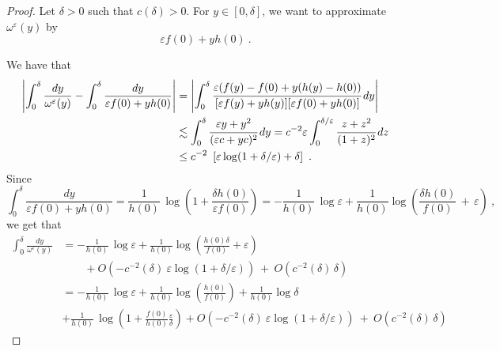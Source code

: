 \documentclass[reqno, 12pt, a4paper]{amsart}
\theoremstyle{plain}
\theoremstyle{definition}
\begin{document}
\begin{proof} 

Let $\delta>0$ such that $c(\delta)>0$. For $y \in [0,\delta]$, we want to approximate $\omega^\varepsilon (y)$ by 
\begin{equation}
\varepsilon f(0) + y h(0) \ .
\end{equation}

We have that 
\begin{equation}
\label{eq:0delta}
\begin{split}
\left\vert \int_0^\delta \frac{dy}{\omega^\varepsilon (y)} - \int_0^\delta \frac{dy}{\varepsilon f(0) + y h(0)}\right\vert &= \left\vert \int_0^\delta \cfrac{\varepsilon (f(y)- f(0) +y (h(y) -h(0))}{[\varepsilon f(y) + y h(y)][\varepsilon f(0) + y h(0)]} \, dy\right\vert \\
&\lesssim \int_0^\delta \cfrac{\varepsilon y + y^2}{(\varepsilon c + yc)^2} \, dy = c^{-2} \varepsilon  \int_0^{\delta/\varepsilon} \cfrac{ z + z^2}{(1+z)^2} \, dz \\
&\le c^{-2} \ \left[ \varepsilon \log (1+ \delta/\varepsilon) + \delta \right]      \ .   
\end{split}
\end{equation}
Since
\begin{equation}
\int_0^\delta \frac{dy}{\varepsilon f(0) + y h(0)} = \frac{1}{h(0)} \, \log\left(1 + \frac{\delta h(0)}{\varepsilon f(0)}\right) =- \frac{1}{h(0)} \, \log \varepsilon + \frac{1}{h(0)} \log\left(\frac{\delta h(0)}{f(0)} \, + \, \varepsilon \right) \ ,
\end{equation}
we get that 
\begin{equation}
\begin{split}
\int_0^\delta \frac{dy}{\omega^\varepsilon (y)} &= - \frac{1}{h(0)} \, \log \varepsilon + \frac{1}{h(0)} \log\left(\frac{h(0) \delta}{f(0)} + \varepsilon \right)  \\ 
&\quad \quad  +  O (- c^{-2} (\delta) \  \varepsilon \log (1+ \delta/\varepsilon))  \ + \ O(c^{-2} (\delta) \, \delta) \\
&=  - \frac{1}{h(0)} \, \log \varepsilon + \frac{1}{h(0)} \log\left(\frac{h(0)}{f(0)} \right) + \frac{1}{h(0)} \log \delta \\
&+ \frac{1}{h(0)} \, \log \left( 1+ \frac{f(0)}{h(0)} \frac{\varepsilon}{\delta} \right)  +  O (- c^{-2} (\delta) \  \varepsilon \log (1+ \delta/\varepsilon))  \ + \ O(c^{-2} (\delta)\,  \delta)
\end{split}
\end{equation}


\end{proof}
\end{document}
